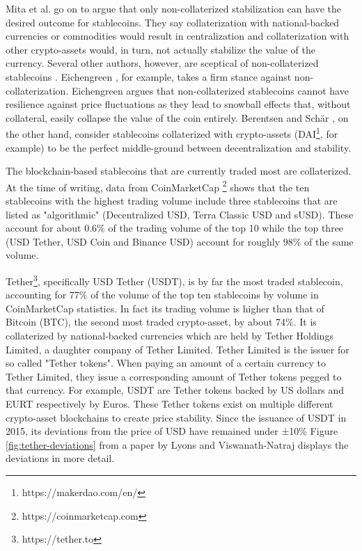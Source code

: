 Mita et al. go on to argue that only non-collaterized stabilization
can have the desired outcome for stablecoins. They say collaterization
with national-backed currencies or commodities would result in
centralization and collaterization with other crypto-assets would,
in turn, not actually stabilize the value of the currency. Several
other authors, however, are sceptical of non-collaterized stablecoins
\cite{berentsenStablecoins,bullmannSearch,eichengreenCommodity,lyonsStable}.
Eichengreen \cite{eichengreenCommodity}, for example, takes a firm
stance against non-collaterization. Eichengreen argues that
non-collaterized stablecoins cannot have resilience against price
fluctuations as they lead to snowball effects that, without
collateral, easily collapse the value of the coin entirely. Berentsen
and Schär \cite{berentsenStablecoins}, on the other hand, consider
stablecoins collaterized with crypto-assets
(DAI\footnote{https://makerdao.com/en/}, for example) to be the
perfect middle-ground between decentralization and stability.

The blockchain-based stablecoins that are currently traded most are
collaterized. At the time of writing, data from CoinMarketCap
\footnote{https://coinmarketcap.com} shows that the ten stablecoins
with the highest trading volume include three stablecoins that are
listed as "algorithmic" (Decentralized USD, Terra Classic USD and
sUSD). These account for about 0.6\% of the trading volume of the top
10 while the top three (USD Tether, USD Coin and Binance USD) account
for roughly 98\% of the same volume.

Tether\footnote{https://tether.to}, specifically USD Tether (USDT),
is by far the most traded stablecoin, accounting for 77\% of the
volume of the top ten stablecoins by volume in CoinMarketCap
statistics. In fact its trading volume is higher than that of Bitcoin
(BTC), the second most traded crypto-asset, by about 74\%. It is
collaterized by national-backed currencies which are held by Tether
Holdings Limited, a daughter company of Tether Limited. Tether Limited
is the issuer for so called "Tether tokens". When paying an amount of
a certain currency to Tether Limited, they issue a corresponding
amount of Tether tokens pegged to that currency. For example, USDT are
Tether tokens backed by US dollars and EURT respectively by
Euros. These Tether tokens exist on multiple different crypto-asset
blockchains to create price stability. Since the issuance of USDT in
2015, its deviations from the price of USD have remained under ±10\%
Figure \ref{fig:tether-deviations} from a paper by Lyons and
Viswanath-Natraj \cite{lyonsStable} displays the deviations in more
detail.

